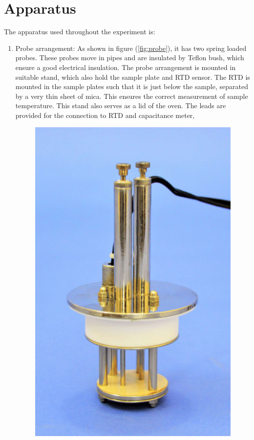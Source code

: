 \documentclass[%
 aip,
 amsmath,amssymb,
 reprint, floatfix%
]{revtex4-1}
\begin{document}
\section{Apparatus}
    The apparatus used throughout the experiment is:
    \begin{enumerate}
        \item Probe arrangement: As shown in figure (\ref{fig:probe}), it has two spring loaded probes. These probes move in pipes and are insulated by Teflon bush, which ensure a good electrical insulation. The probe arrangement is mounted in suitable stand, which also hold the sample plate and RTD sensor. The RTD is mounted in the sample plates such that it is just below the sample, separated by a very thin sheet of mica. This ensures the correct measurement of sample temperature. This stand also serves as a lid of the oven. The leads are provided for the connection to RTD and capacitance meter,
        \begin{figure}
            \centering
            \includegraphics[scale = 0.4]{Figures/dielectric-arrange.png}

\end{figure}
\end{enumerate}
\end{document}
